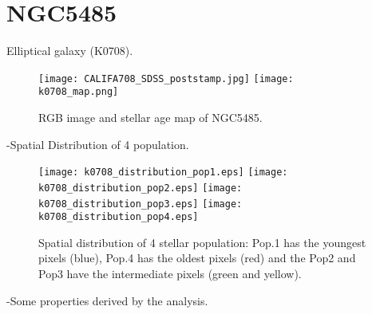 \newpage
\section*{NGC5485}
Elliptical galaxy (K0708).

\begin{figure}[bh]
\begin{center}
\texttt{[image: CALIFA708\_SDSS\_poststamp.jpg]}
\texttt{[image: k0708\_map.png]}
\caption{RGB image and stellar age map of NGC5485.}
   \label{fig1}
\end{center}
\end{figure}

-Spatial Distribution of 4 population.

\begin{figure}[bh]
\begin{center}
\texttt{[image: k0708\_distribution\_pop1.eps]}
\texttt{[image: k0708\_distribution\_pop2.eps]}
\texttt{[image: k0708\_distribution\_pop3.eps]}
\texttt{[image: k0708\_distribution\_pop4.eps]}
 \caption{Spatial distribution of 4 stellar population: Pop.1 has the youngest pixels (blue), Pop.4 has the oldest pixels (red) and the Pop2 and Pop3 have the intermediate pixels (green and yellow).}
   \label{fig1}
\end{center}
\end{figure}

-Some properties derived by the analysis.


